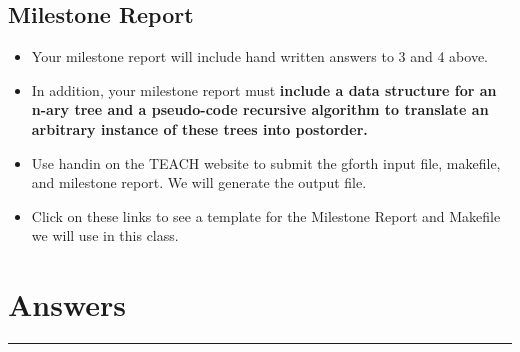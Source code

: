 \documentclass[letterpaper,10pt]{article}
\begin{document}
\subsection{Milestone Report}
\begin{itemize}
\item Your milestone report will include hand written answers to 3 and 4 above.
\item In addition, your milestone report must \textbf{include a data structure for an n-ary tree and a pseudo-code recursive algorithm to translate an arbitrary instance of these trees into postorder.}
\item Use handin on the TEACH website to submit the gforth input file, makefile, and milestone report. We will generate the output file. 
\item Click on these links to see a template for the Milestone Report and Makefile we will use in this class.
\end{itemize}
\newpage
\section{Answers} \hrule
\end{document}
